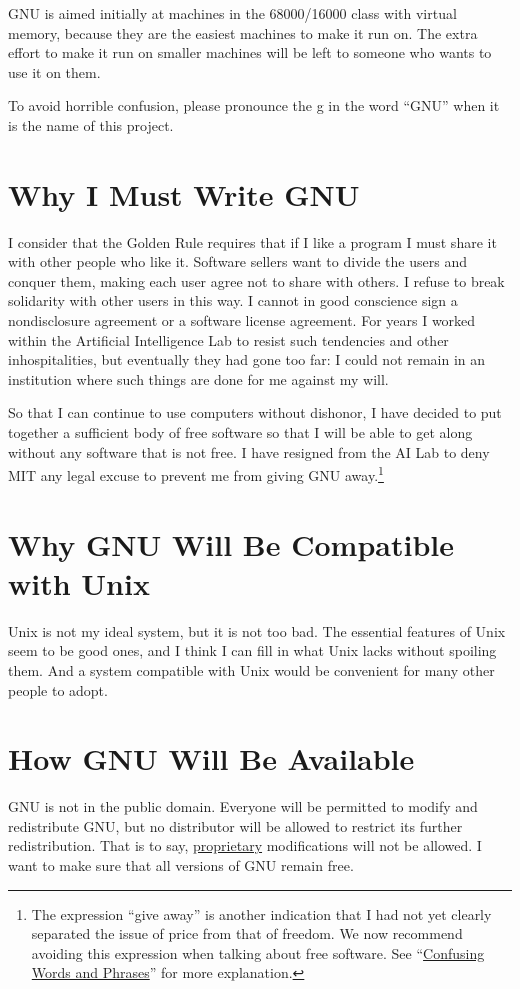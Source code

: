 GNU is aimed initially at machines in the 68000/16000 class with virtual memory, because they are the easiest machines to make it run on. The extra effort to make it run on smaller machines will be left to someone who wants to use it on them.\par
To avoid horrible confusion, please pronounce the g in the word “GNU” when it is the name of this project.
\section{Why I Must Write GNU}
I consider that the Golden Rule requires that if I like a program I must share it with other people who like it. Software sellers want to divide the users and conquer them, making each user agree not to share with others. I refuse to break solidarity with other users in this way. I cannot in good conscience sign a nondisclosure agreement or a software license agreement. For years I worked within the Artificial Intelligence Lab to resist such tendencies and other inhospitalities, but eventually they had gone too far: I could not remain in an institution where such things are done for me against my will.\par
So that I can continue to use computers without dishonor, I have decided to put together a sufficient body of free software so that I will be able to get along without any software that is not free. I have resigned from the AI Lab to deny MIT any legal excuse to prevent me from giving GNU away.\footnote{The expression “give away” is another indication that I had not yet clearly separated the issue of price from that of freedom. We now recommend avoiding this expression when talking about free software. See “\href{http://www.gnu.org/philosophy/words-to-avoid.html\#GiveAwaySoftware}{Confusing Words and Phrases}” for more explanation.}
\section{Why GNU Will Be Compatible with Unix}
Unix is not my ideal system, but it is not too bad. The essential features of Unix seem to be good ones, and I think I can fill in what Unix lacks without spoiling them. And a system compatible with Unix would be convenient for many other people to adopt.
\section{How GNU Will Be Available}
GNU is not in the public domain. Everyone will be permitted to modify and redistribute GNU, but no distributor will be allowed to restrict its further redistribution. That is to say, \href{http://www.gnu.org/philosophy/categories.html\#ProprietarySoftware}{proprietary} modifications will not be allowed. I want to make sure that all versions of GNU remain free.
